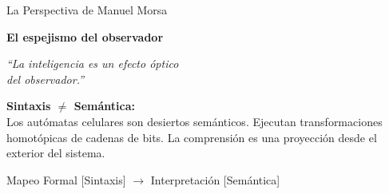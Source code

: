 \documentclass[10pt, aspectratio=169]{beamer}
\begin{document}

\begin{frame}{La Perspectiva de Manuel Morsa}
    \begin{center}
        \Large \textbf{El espejismo del observador}
        
        \vspace{0.8cm}
        \huge \textit{``La inteligencia es un efecto óptico\\ del observador.''}
        \vspace{0.8cm}
    \end{center}
    
    \normalsize
    \alert{\textbf{Sintaxis $\neq$ Semántica:}} \\
    Los autómatas celulares son desiertos semánticos. Ejecutan transformaciones homotópicas de cadenas de bits. La comprensión es una proyección desde el exterior del sistema.
    
    \vspace{0.4cm}
    \begin{center}
        \large Mapeo Formal [Sintaxis] $\longrightarrow$ Interpretación [Semántica]
    \end{center}
\end{frame}

\end{document}
